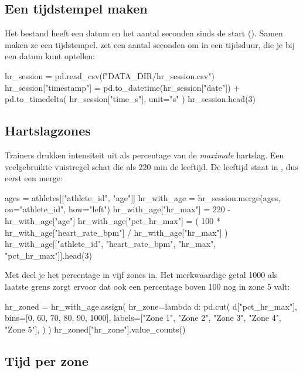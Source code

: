 \documentclass[11pt,a4paper]{article}
\begin{document}
\subsection{Een tijdstempel maken}

Het bestand heeft een datum en het aantal seconden sinds de start
(). Samen maken ze een tijdstempel.
 zet een aantal seconden om in een
tijdsduur, die je bij een datum kunt optellen:

\begin{python}
hr_session = pd.read_csv(f"{DATA_DIR}/hr_session.csv")
hr_session["timestamp"] = pd.to_datetime(hr_session["date"]) + pd.to_timedelta(
    hr_session["time_s"], unit="s"
)
hr_session.head(3)
\end{python}

\subsection{Hartslagzones}

Trainers drukken intensiteit uit als percentage van de \emph{maximale}
hartslag. Een veelgebruikte vuistregel schat die als 220 min de leeftijd.
De leeftijd staat in , dus eerst een merge:

\begin{python}
ages = athletes[["athlete_id", "age"]]
hr_with_age = hr_session.merge(ages, on="athlete_id", how="left")
hr_with_age["hr_max"] = 220 - hr_with_age["age"]
hr_with_age["pct_hr_max"] = (
    100 * hr_with_age["heart_rate_bpm"] / hr_with_age["hr_max"]
)
hr_with_age[["athlete_id", "heart_rate_bpm", "hr_max", "pct_hr_max"]].head(3)
\end{python}

Met  deel je het percentage in vijf zones in. Het merkwaardige
getal 1000 als laatste grens zorgt ervoor dat ook een percentage boven
100 nog in zone 5 valt:

\begin{python}
hr_zoned = hr_with_age.assign(
    hr_zone=lambda d: pd.cut(
        d["pct_hr_max"],
        bins=[0, 60, 70, 80, 90, 1000],
        labels=["Zone 1", "Zone 2", "Zone 3", "Zone 4", "Zone 5"],
    )
)
hr_zoned["hr_zone"].value_counts()
\end{python}

\subsection{Tijd per zone}
\end{document}
